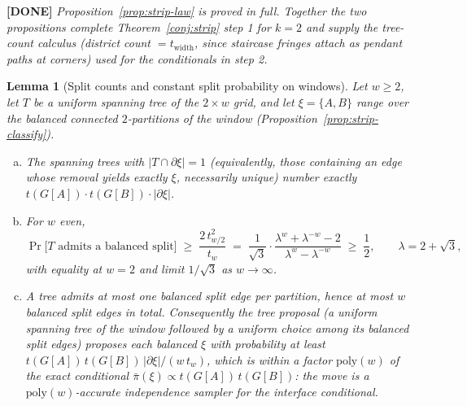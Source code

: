 \documentclass[11pt]{article}
\newcommand{\done}[1]{\medskip\noindent\textcolor{donecol}{\textbf{[DONE]} \emph{#1}}\medskip}
\newtheorem{lemma}[theorem]{Lemma}
\begin{document}
\done{Proposition~\ref{prop:strip-law} is proved in full. Together the two
propositions complete Theorem~\ref{conj:strip} step 1 for $k = 2$ and
supply the tree-count calculus (district count $= t_{\mathrm{width}}$, since
staircase fringes attach as pendant paths at corners) used for the
conditionals in step 2.}

\begin{lemma}[Split counts and constant split probability on windows]
\label{lem:split}
Let $w \ge 2$, let $T$ be a uniform spanning tree of the $2 \times w$ grid,
and let $\xi = \{A, B\}$ range over the balanced connected $2$-partitions of
the window (Proposition~\ref{prop:strip-classify}).
\begin{enumerate}[(a)]
  \item The spanning trees with $|T \cap \partial\xi| = 1$ (equivalently,
    those containing an edge whose removal yields exactly $\xi$, necessarily
    unique) number exactly $t(G[A]) \cdot t(G[B]) \cdot |\partial\xi|$.
  \item For $w$ even,
    \[
      \Pr\bigl[T \text{ admits a balanced split}\bigr]
        \;\ge\; \frac{2\, t_{w/2}^2}{t_w}
        \;=\; \frac{1}{\sqrt 3}\cdot
          \frac{\lambda^w + \lambda^{-w} - 2}{\lambda^w - \lambda^{-w}}
        \;\ge\; \frac12,
      \qquad \lambda = 2 + \sqrt 3,
    \]
    with equality at $w = 2$ and limit $1/\sqrt 3$ as $w \to \infty$.
  \item A tree admits at most one balanced split edge per partition, hence
    at most $w$ balanced split edges in total. Consequently the
    tree proposal (a uniform spanning tree of the window followed
    by a uniform choice among its balanced split edges) proposes each
    balanced $\xi$ with probability at least
    $t(G[A])\, t(G[B])\, |\partial\xi| / (w \, t_w)$, which is within a
    factor $\mathrm{poly}(w)$ of the exact conditional
    $\bar\pi(\xi) \propto t(G[A])\, t(G[B])$: the move is a
    $\mathrm{poly}(w)$-accurate independence sampler for the interface
    conditional.
\end{enumerate}
\end{lemma}
\end{document}
